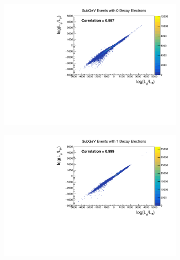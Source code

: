 \begin{figure}[h]
  \begin{subfigure}[t]{0.49\textwidth}
    \includegraphics[width=\textwidth, trim={0mm 0mm 0mm 0mm}, clip,page=1]{Figures/Selections/Correlation_SG0Dcy.pdf}
  \end{subfigure}%
  \begin{subfigure}[t]{0.49\textwidth}
    \includegraphics[width=\textwidth, trim={0mm 0mm 0mm 0mm}, clip,page=1]{Figures/Selections/Correlation_SG1Dcy.pdf}
  \end{subfigure}
  \begin{subfigure}[t]{0.49\textwidth}

\end{subfigure}
\end{figure}
